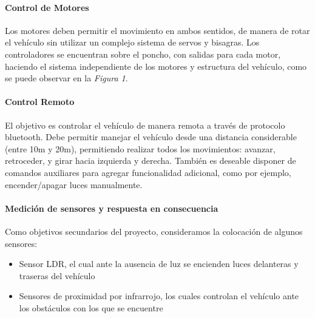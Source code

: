 \paragraph{Control de Motores}
Los motores deben permitir el movimiento en ambos sentidos, de manera de rotar el vehículo sin utilizar un complejo sistema de servos y bisagras. Los controladores se encuentran sobre el poncho, con salidas para cada motor, haciendo el sistema independiente de los motores y estructura del vehículo, como se puede observar en la \textit{Figura 1}.

\paragraph{Control Remoto}
El objetivo es controlar el vehículo de manera remota a través de protocolo bluetooth. Debe permitir manejar el vehículo desde una distancia considerable (entre 10m y 20m), permitiendo realizar todos los movimientos: avanzar, retroceder, y girar hacia izquierda y derecha. También es deseable disponer de comandos auxiliares para agregar funcionalidad adicional, como por ejemplo, encender/apagar luces manualmente.

\paragraph{Medición de sensores y respuesta en consecuencia}
Como objetivos secundarios del proyecto, consideramos la colocación de algunos sensores: 
\begin{itemize}
	\item Sensor LDR, el cual ante la ausencia de luz se encienden luces delanteras y traseras del vehículo
	\item Sensores de proximidad por infrarrojo, los cuales controlan  el vehículo ante los obstáculos con los que se encuentre
\end{itemize}
